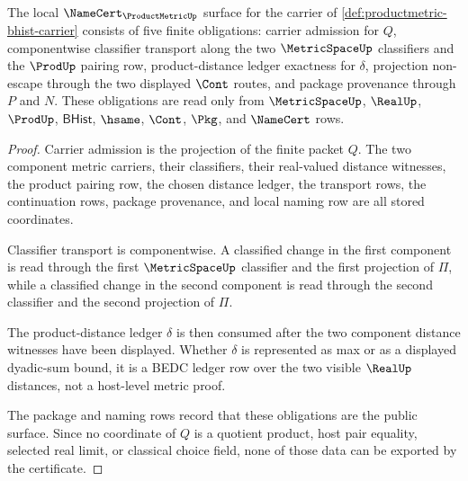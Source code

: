 \begin{theorem}
\label{thm:productmetric-namecert-obligations}
The local $\NameCert_{\ProductMetricUp}$ surface for the carrier of \autoref{def:productmetric-bhist-carrier} consists of five finite obligations: carrier admission for $Q$, componentwise classifier transport along the two $\MetricSpaceUp$ classifiers and the $\ProdUp$ pairing row, product-distance ledger exactness for $\delta$, projection non-escape through the two displayed $\Cont$ routes, and package provenance through $P$ and $N$. These obligations are read only from $\MetricSpaceUp$, $\RealUp$, $\ProdUp$, $\mathsf{BHist}$, $\hsame$, $\Cont$, $\Pkg$, and $\NameCert$ rows.
\end{theorem}
\begin{proof}
Carrier admission is the projection of the finite packet $Q$. The two component metric carriers, their classifiers, their real-valued distance witnesses, the product pairing row, the chosen distance ledger, the transport rows, the continuation rows, package provenance, and local naming row are all stored coordinates.

Classifier transport is componentwise. A classified change in the first component is read through the first $\MetricSpaceUp$ classifier and the first projection of $\Pi$, while a classified change in the second component is read through the second classifier and the second projection of $\Pi$.

The product-distance ledger $\delta$ is then consumed after the two component distance witnesses have been displayed. Whether $\delta$ is represented as max or as a displayed dyadic-sum bound, it is a BEDC ledger row over the two visible $\RealUp$ distances, not a host-level metric proof.

The package and naming rows record that these obligations are the public surface. Since no coordinate of $Q$ is a quotient product, host pair equality, selected real limit, or classical choice field, none of those data can be exported by the certificate.
\end{proof}

